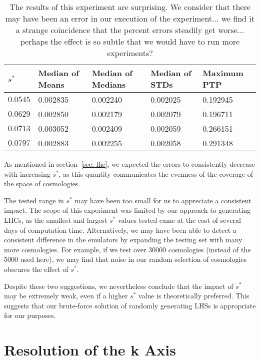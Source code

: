 \begin{table}[ht!]
\centering
\begin{tabular}{l|l|l|l|l}
\hline
$s^*$ & Median of Means & Median of Medians & Median of STDs & Maximum PTP \\ \hline
$0.0545$ & 0.002835 & 0.002240 & 0.002025 & 0.192945 \\
$0.0629$ & 0.002850 & 0.002179 & 0.002079 & 0.196711 \\
$0.0713$ & 0.003052 & 0.002409 & 0.002059 & 0.266151 \\
$0.0797$ & 0.002883 & 0.002255 & 0.002058 & 0.291348 \\
\end{tabular}
	\cprotect\caption[$s^*$ Experiment: Percent Error Statistics]{The
		results of this experiment are surprising. We consider that there
		may have been an error in our execution of the experiment...
		we find it a strange coincidence that the percent errors steadily
		get worse... perhaps the effect is so subtle that we would have to
		run more experiments?}
 \label{tab: minsep_experiment_percerr_stats}
\end{table}

As mentioned in section~\ref{sec: lhc}, we expected the errors to consistently
decrease with increasing $s^*$, as this quantity communicates the evenness of 
the coverage of the space of cosmologies.

The tested range in $s^*$ may have been too small for us to appreciate a
consistent impact. The scope of this experiment was limited by our approach
to generating LHCs, as the smallest and largest $s^*$ values tested came at
the cost of several days of computation time. Alternatively, we may have been
able to detect a consistent difference in the emulators by expanding the
testing set with many more cosmologies. For example, if we test over
30000 cosmologies (instead of the 5000 used here), we may find that noise in
our random selection of cosmologies obscures the effect of $s^*$.

Despite these two suggestions, we nevertheless conclude that the impact of
$s^*$ may be extremely weak, even if a higher $s^*$ value is theoretically
preferred. This suggests that our brute-force solution of randomly generating
LHSs is appropriate for our purposes.


\section{Resolution of the k Axis}

